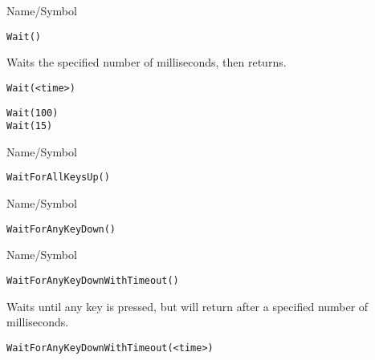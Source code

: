 \begin{desc}{Name/Symbol}
\item[Name/Symbol]  	\verb+Wait()+ 

\item[Description] 	Waits the specified number of milliseconds, then returns. 

\item[Usage]
\begin{verbatim}
Wait(<time>)
\end{verbatim}

\item[Example]
\begin{verbatim}
Wait(100)
Wait(15)
\end{verbatim}

\item[See Also]	
\end{desc}

\rl


\begin{desc}{Name/Symbol}
\item[Name/Symbol]  	\verb+WaitForAllKeysUp()+

\item[Description]	

\item[Usage]		

\item[Example]	

\item[See Also]	
\end{desc}

\rl


\begin{desc}{Name/Symbol}
\item[Name/Symbol]  	\verb+WaitForAnyKeyDown()+

\item[Description]	

\item[Usage]		

\item[Example]	

\item[See Also]	
\end{desc}

\rl


\begin{desc}{Name/Symbol}
\item[Name/Symbol]  	\verb+WaitForAnyKeyDownWithTimeout()+

\item[Description] Waits until any key is pressed, but will return
  after a specified number of milliseconds.

\item[Usage]
\begin{verbatim}
WaitForAnyKeyDownWithTimeout(<time>)
\end{verbatim}

\item[Example]	

\item[See Also]	
\end{desc}

